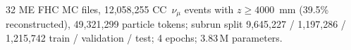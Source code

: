 32 ME FHC MC files, 12{,}058{,}255 CC~$\nu_\mu$ events with $z \ge 4000$~mm (39.5\% reconstructed), 49{,}321{,}299 particle tokens; subrun split 9{,}645{,}227 / 1{,}197{,}286 / 1{,}215{,}742 train / validation / test; 4 epochs; 3.83\,M parameters.
